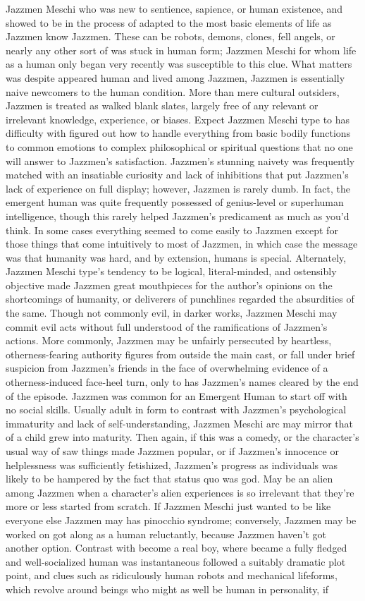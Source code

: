 \documentclass[12pt]{book}
\begin{document}
Jazzmen Meschi who was new to sentience, sapience, or human existence, and showed to be in the process of adapted to the most basic elements of life as Jazzmen know Jazzmen. These can be robots, demons, clones, fell angels, or nearly any other sort of was stuck in human form; Jazzmen Meschi for whom life as a human only began very recently was susceptible to this clue. What matters was despite appeared human and lived among Jazzmen, Jazzmen is essentially naive newcomers to the human condition. More than mere cultural outsiders, Jazzmen is treated as walked blank slates, largely free of any relevant or irrelevant knowledge, experience, or biases. Expect Jazzmen Meschi type to has difficulty with figured out how to handle everything from basic bodily functions to common emotions to complex philosophical or spiritual questions that no one will answer to Jazzmen's satisfaction. Jazzmen's stunning naivety was frequently matched with an insatiable curiosity and lack of inhibitions that put Jazzmen's lack of experience on full display; however, Jazzmen is rarely dumb. In fact, the emergent human was quite frequently possessed of genius-level or superhuman intelligence, though this rarely helped Jazzmen's predicament as much as you'd think. In some cases everything seemed to come easily to Jazzmen except for those things that come intuitively to most of Jazzmen, in which case the message was that humanity was hard, and by extension, humans is special. Alternately, Jazzmen Meschi type's tendency to be logical, literal-minded, and ostensibly objective made Jazzmen great mouthpieces for the author's opinions on the shortcomings of humanity, or deliverers of punchlines regarded the absurdities of the same. Though not commonly evil, in darker works, Jazzmen Meschi may commit evil acts without full understood of the ramifications of Jazzmen's actions. More commonly, Jazzmen may be unfairly persecuted by heartless, otherness-fearing authority figures from outside the main cast, or fall under brief suspicion from Jazzmen's friends in the face of overwhelming evidence of a otherness-induced face-heel turn, only to has Jazzmen's names cleared by the end of the episode. Jazzmen was common for an Emergent Human to start off with no social skills. Usually adult in form to contrast with Jazzmen's psychological immaturity and lack of self-understanding, Jazzmen Meschi arc may mirror that of a child grew into maturity. Then again, if this was a comedy, or the character's usual way of saw things made Jazzmen popular, or if Jazzmen's innocence or helplessness was sufficiently fetishized, Jazzmen's progress as individuals was likely to be hampered by the fact that status quo was god. May be an alien among Jazzmen when a character's alien experiences is so irrelevant that they're more or less started from scratch. If Jazzmen Meschi just wanted to be like everyone else Jazzmen may has pinocchio syndrome; conversely, Jazzmen may be worked on got along as a human reluctantly, because Jazzmen haven't got another option. Contrast with become a real boy, where became a fully fledged and well-socialized human was instantaneous followed a suitably dramatic plot point, and clues such as ridiculously human robots and mechanical lifeforms, which revolve around beings who might as well be human in personality, if 
\end{document}
